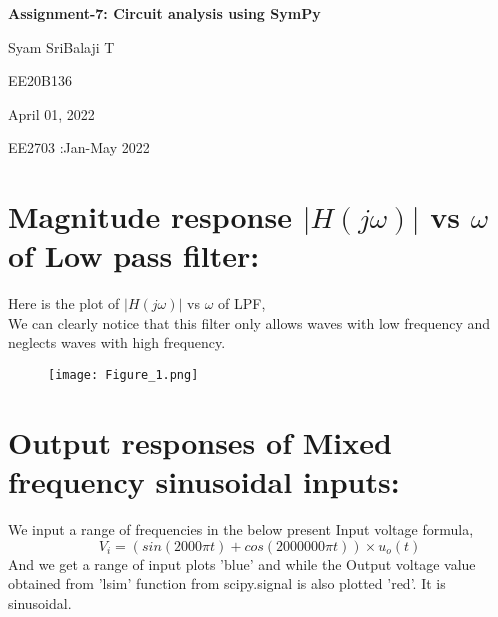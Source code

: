 \documentclass[12pt]{article}
\newcommand\titleofdoc{\LARGE{\textbf{Assignment-7: Circuit analysis using SymPy}}}
\begin{document}
\begin{titlepage}
   \begin{center}
        \vspace*{4cm} %

        \Huge{\titleofdoc} 

        \vspace{3 cm}
        \Large{Syam SriBalaji T}
       
        \vspace{0.25cm}
        \large{EE20B136}
       
        \vspace{3 cm}
        \Large{April 01, 2022}
        
        \vspace{0.25 cm}
        \Large{EE2703 :Jan-May 2022}
       

       \vfill
    \end{center}
\end{titlepage}

\setcounter{page}{2}
\pagestyle{fancy}
\fancyhf{}
\rhead{\thepage}

\section*{Magnitude response $|H(j\omega)|$ vs $\omega$ of Low pass filter:}

Here is the plot of $|H(j\omega)|$ vs $\omega$ of LPF,\\
We can clearly notice that this filter only allows waves with low frequency and neglects waves with high frequency.

\begin{figure}[h!]
\centering
\texttt{[image: Figure\_1.png]}
\end{figure}

\newpage
\section*{Output responses of Mixed frequency sinusoidal inputs:}

We input a range of frequencies in the below present Input voltage formula, 
\begin{equation*}
V_{i}=(sin(2000\pi t)+cos(2000000\pi t))\times u_{o}(t)
\end{equation*}
And we get a range of input plots 'blue' and while the Output voltage value obtained from 'lsim' function from scipy.signal is also plotted 'red'. It is sinusoidal.\\
\end{document}
